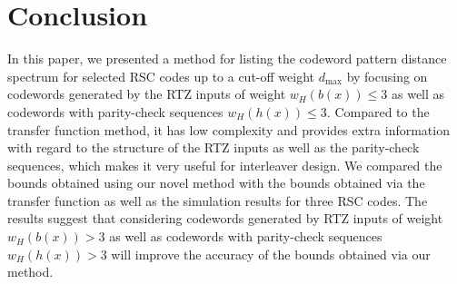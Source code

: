 \section{Conclusion}
\label{sec6}
 



In this paper, we presented a method for listing the codeword pattern distance spectrum for selected RSC codes up to a cut-off weight $d_{\text{max}}$ by focusing on codewords generated by the RTZ inputs of weight $w_H(b(x)) \leq 3$ as well as codewords with parity-check sequences $w_H(h(x)) \leq 3$. Compared to the transfer function method, it has low complexity and provides extra information with regard to the structure of the RTZ inputs as well as the parity-check sequences, which makes it very useful for interleaver design. We compared the bounds obtained using our novel method with the bounds obtained via the transfer function as well as the simulation results for three RSC codes. The results suggest that considering codewords generated by RTZ inputs of weight $w_H(b(x)) > 3$ as well as codewords with parity-check sequences $w_H(h(x)) > 3$  will improve the accuracy of the bounds obtained via our method.